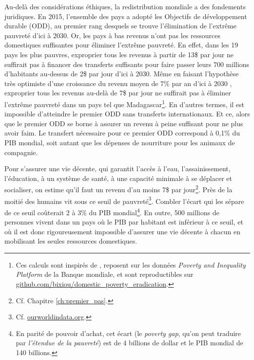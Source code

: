 \documentclass[a5paper,french]{memoir}
\begin{document}
Au-delà des considérations éthiques, la redistribution mondiale a des fondements juridiques. En 2015, l'ensemble des pays a adopté les Objectifs de développement durable (ODD), au premier rang desquels se trouve l'élimination de l'extrême pauvreté d'ici à 2030. Or, les pays à bas revenus n'ont pas les ressources domestiques suffisantes pour éliminer l'extrême pauvreté. En effet,  dans les 19 pays les plus pauvres, exproprier tous les revenus à partir de 13\$ par jour ne suffirait pas à financer des transferts suffisants pour faire passer leurs 700 millions d'habitants au-dessus de 2\$ par jour d'ici à 2030. Même en faisant l'hypothèse très optimiste d'une croissance du revenu moyen de 7\% par an d'ici à 2030%
, exproprier tous les revenus au-delà de 7\$ par jour ne suffirait pas à éliminer l'extrême pauvreté dans un pays tel que Madagascar\footnote{Ces calculs sont inspirés de \citet{bolch_arithmetics_2022}, reposent sur les données \textit{Poverty and Inequality Platform} de la Banque mondiale, et sont reproductibles sur \href{https://github.com/bixiou/domestic\_poverty\_eradication/code\_poverty/main.R}{github.com/bixiou/domestic\_poverty\_eradication}.}. En d'autres termes, il est impossible d'atteindre le premier ODD sans transferts internationaux. Et ce, alors que le premier ODD se borne à assurer un revenu à peine suffisant pour ne plus avoir faim. Le transfert nécessaire pour ce premier ODD correspond à 0,1\% du PIB mondial, soit autant que les dépenses de nourriture pour les animaux de compagnie. %

Pour s'assurer une vie décente, qui garantit l'accès à l'eau, l'assainissement, l'éducation, à un système de santé, à une capacité minimale à se déplacer et socialiser, on estime qu'il faut un revenu d'au moins 7\$ par jour\footnote{Cf. Chapitre \ref{ch:premier_pas}.}. Près de la moitié des humains vit sous ce seuil de pauvreté\footnote{Cf. \href{https://ourworldindata.org/grapher/distribution-of-population-between-different-poverty-thresholds-up-to-30-dollars}{ourworldindata.org}.}. Combler l'écart qui les sépare de ce seuil coûterait 2 à 3\% du PIB mondial\footnote{En parité de pouvoir d'achat, cet écart (le \textit{poverty gap}, qu'on peut traduire par \textit{l'étendue de la pauvreté}) est de 4 billions de dollar et le PIB mondial de 140 billions.}. %
En outre, 500 millions de personnes vivent dans un pays où le PIB par habitant est inférieur à ce seuil, et où il est donc rigoureusement impossible d'assurer une vie décente à chacun en mobilisant les seules ressources domestiques. 
\end{document}
